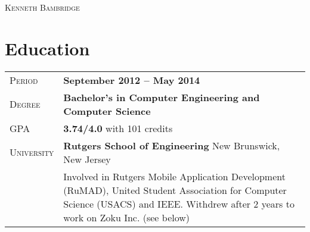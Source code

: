 \documentclass[a4paper, oneside, final]{scrartcl} %
\newcommand{\gray}{\rowcolor[gray]{.90}} %
\begin{document}
\begin{center} %


{\fontsize{30}{30}\selectfont\scshape Kenneth Bambridge} %

\vspace{0.8cm} %


%


\section{Education}

\begin{tabularx}{0.97\linewidth}{>{\raggedleft\scshape}p{2cm}X}
\gray Period & \textbf{September 2012 -- May 2014}\\
\gray Degree & \textbf{Bachelor's in Computer Engineering and Computer Science}\\
\gray GPA & \textbf{3.74/4.0} with 101 credits \\
\gray University & \textbf{Rutgers School of Engineering} \hfill New Brunswick, New Jersey\\
 & Involved in Rutgers Mobile Application Development (RuMAD), United Student Association for
    Computer Science (USACS) and IEEE. Withdrew after 2 years to work on Zoku Inc. (see below)
\end{tabularx}

\vspace{10pt}


\end{center}
\end{document}
